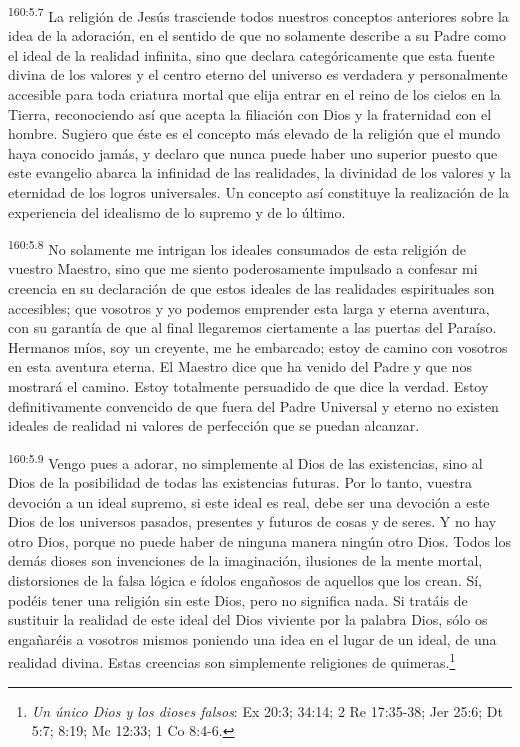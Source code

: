 \par
\textsuperscript{160:5.7} La religión de Jesús trasciende todos nuestros conceptos anteriores sobre la idea de la adoración, en el sentido de que no solamente describe a su Padre como el ideal de la realidad infinita, sino que declara categóricamente que esta fuente divina de los valores y el centro eterno del universo es verdadera y personalmente accesible para toda criatura mortal que elija entrar en el reino de los cielos en la Tierra, reconociendo así que acepta la filiación con Dios y la fraternidad con el hombre. Sugiero que éste es el concepto más elevado de la religión que el mundo haya conocido jamás, y declaro que nunca puede haber uno superior puesto que este evangelio abarca la infinidad de las realidades, la divinidad de los valores y la eternidad de los logros universales. Un concepto así constituye la realización de la experiencia del idealismo de lo supremo y de lo último.

\par
\textsuperscript{160:5.8} No solamente me intrigan los ideales consumados de esta religión de vuestro Maestro, sino que me siento poderosamente impulsado a confesar mi creencia en su declaración de que estos ideales de las realidades espirituales son accesibles; que vosotros y yo podemos emprender esta larga y eterna aventura, con su garantía de que al final llegaremos ciertamente a las puertas del Paraíso. Hermanos míos, soy un creyente, me he embarcado; estoy de camino con vosotros en esta aventura eterna. El Maestro dice que ha venido del Padre y que nos mostrará el camino. Estoy totalmente persuadido de que dice la verdad. Estoy definitivamente convencido de que fuera del Padre Universal y eterno no existen ideales de realidad ni valores de perfección que se puedan alcanzar.

\par
\textsuperscript{160:5.9} Vengo pues a adorar, no simplemente al Dios de las existencias, sino al Dios de la posibilidad de todas las existencias futuras. Por lo tanto, vuestra devoción a un ideal supremo, si este ideal es real, debe ser una devoción a este Dios de los universos pasados, presentes y futuros de cosas y de seres. Y no hay otro Dios, porque no puede haber de ninguna manera ningún otro Dios. Todos los demás dioses son invenciones de la imaginación, ilusiones de la mente mortal, distorsiones de la falsa lógica e ídolos engañosos de aquellos que los crean. Sí, podéis tener una religión sin este Dios, pero no significa nada. Si tratáis de sustituir la realidad de este ideal del Dios viviente por la palabra Dios, sólo os engañaréis a vosotros mismos poniendo una idea en el lugar de un ideal, de una realidad divina. Estas creencias son simplemente religiones de quimeras.\footnote{\textit{Un único Dios y los dioses falsos}: Ex 20:3; 34:14; 2 Re 17:35-38; Jer 25:6; Dt 5:7; 8:19; Mc 12:33; 1 Co 8:4-6.}

